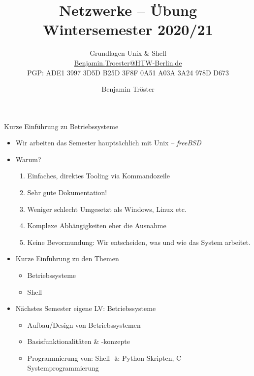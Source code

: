 \documentclass[xcolor=dvipsnames,aspectratio=169]{beamer}
\begin{document}

\title{Netzwerke -- Übung\\Wintersemester 2020/21}
\subtitle{Grundlagen Unix \& Shell\\
\href{mailto:Benjamin.Troester@HTW-Berlin.de}{Benjamin.Troester@HTW-Berlin.de}\\
		PGP: ADE1 3997 3D5D B25D 3F8F 0A51 A03A 3A24 978D D673 }

\author{Benjamin Tröster}

\date{}

\begin{frame}
\titlepage
\end{frame}

\begin{frame}{Kurze Einführung zu Betriebssysteme}
 \vspace*{-0.8cm} 
	\begin{itemize}
		\item Wir arbeiten das Semester hauptsächlich mit Unix -- \emph{freeBSD}
		\item Warum?
		\begin{enumerate}
			\item Einfaches, direktes Tooling via Kommandozeile
			\item Sehr gute Dokumentation!
			\item Weniger schlecht Umgesetzt als Windows, Linux etc.
			\item Komplexe Abhängigkeiten eher die Ausnahme
			\item Keine Bevormundung: Wir entscheiden, was und wie das System arbeitet.
		\end{enumerate}
		\item Kurze Einführung zu den Themen
		\begin{itemize}
			\item Betriebssysteme
			\item Shell
		\end{itemize}
		\item Nächstes Semester eigene LV: Betriebssysteme
		\begin{itemize}
			\item Aufbau/Design von Betriebssystemen
			\item Basisfunktionalitäten \& -konzepte
			\item Programmierung von: Shell- \& Python-Skripten, C-Systemprogrammierung
		\end{itemize}
	\end{itemize}
\end{frame}
\end{document}
